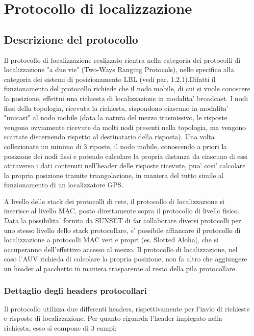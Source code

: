 \chapter{Protocollo di localizzazione}

\section{Descrizione del protocollo}
Il protocollo di localizzazione realizzato rientra nella categoria dei protocolli di localizzazione "a due vie" (Two-Ways Ranging Protocols), nello specifico alla categoria dei sistemi di posizionamento LBL (vedi par. 1.2.1).\newline Difatti il funzionamento del protocollo richiede che il nodo mobile, di cui si vuole conoscere la posizione, effettui una richiesta di localizzazione in modalita' broadcast. I nodi fissi della topologia, ricevuta la richiesta, rispondono ciascuno in modalita' "unicast" al nodo mobile (data la natura del mezzo trasmissivo, le risposte vengono ovviamente ricevute da molti nodi presenti nella topologia, ma vengono scartate discernendo rispetto al destinatario della risposta).  Una volta collezionate un minimo di 3 riposte, il nodo mobile, conoscendo a priori la posizione dei nodi fissi e potendo calcolare la propria distanza da ciascuno di essi attraverso i dati contenuti nell'header delle risposte ricevute, puo' cosi' calcolare la propria posizione tramite triangolazione, in maniera del tutto simile al funzionamento di un localizzatore GPS.

A livello dello stack dei protocolli di rete, il protocollo di localizzazione si inserisce al livello MAC, posto direttamente sopra il protocollo di livello fisico. Data la possibilita' fornita da SUNSET di far collaborare diversi protocolli per uno stesso livello dello stack protocollare, e' possibile affiancare il protocollo di localizzazione a protocolli MAC veri e propri (es. Slotted Aloha), che si occuperanno dell'effettivo accesso al mezzo. Il protocollo di localizzazione, nel caso l'AUV richieda di calcolare la propria posizione, non fa altro che aggiungere un header al pacchetto in maniera trasparente al resto della pila protocollare.

\subsection{Dettaglio degli headers protocollari}
Il protocollo utilizza due differenti headers, rispettivamente  per l'invio di richieste e risposte di localizzazione.
\newline
Per quanto riguarda l'header impiegato nella richiesta, esso si compone di 3 campi:
\newline

